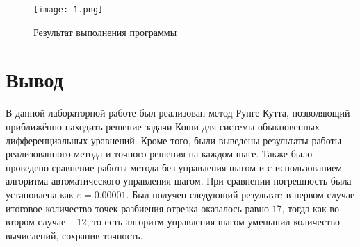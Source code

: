 \documentclass[a4paper, 14pt]{extarticle}
\begin{document}
\begin{figure}[H]
	
	\centering
	
	\texttt{[image: 1.png]}
	\captionsetup{justification=centering}
	\caption{Результат выполнения программы}
	
	\label{fig:mpr}
	
\end{figure}

\pagebreak

\section{Вывод}
В данной лабораторной работе был реализован метод Рунге-Кутта, позволяющий приближённо находить решение задачи Коши для 
системы обыкновенных дифференциальных уравнений. Кроме того, были выведены результаты работы реализованного метода и точного решения на каждом шаге. Также было проведено сравнение работы метода без управления шагом и с использованием алгоритма автоматического управления шагом. При сравнении погрешность была установлена как $\varepsilon = 0.00001$. Был получен следующий результат: в первом случае итоговое количество точек разбиения отрезка оказалось равно $17$, тогда как во втором случае -- $12$, то есть алгоритм 
управления шагом уменьшил количество вычислений, сохранив точность. 
\end{document}

